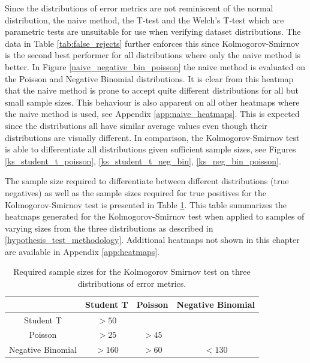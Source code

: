 Since the distributions of error metrics are not reminiscent of the normal distribution, the naive method, the T-test and the Welch's T-test which are parametric tests are unsuitable for use when verifying dataset distributions. The data in Table \ref{tab:false_rejects} further enforces this since Kolmogorov-Smirnov is the second best performer for all distributions where only the naive method is better. In Figure \ref{naive_negative_bin_poisson} the naive method is evaluated on the Poisson and Negative Binomial distributions. It is clear from this heatmap that the naive method is prone to accept quite different distributions for all but small sample sizes. This behaviour is also apparent on all other heatmaps where the naive method is used, see Appendix \ref{app:naive_heatmaps}. This is expected since the distributions all have similar average values even though their distributions are visually different. In comparison, the Kolmogorov-Smirnov test is able to differentiate all distributions given sufficient sample sizes, see Figures \ref{ks_student_t_poisson}, \ref{ks_student_t_neg_bin}, \ref{ks_neg_bin_poisson}.

The sample size required to differentiate between different distributions (true negatives) as well as the sample sizes required for true positives for the Kolmogorov-Smirnov test is presented in Table \ref{tab:required_sample_sizes}. This table summarizes the heatmaps generated for the Kolmogorov-Smirnov test when applied to samples of varying sizes from the three distributions as described in \ref{hypothesis_test_methodology}. Additional heatmaps not shown in this chapter are available in Appendix \ref{app:heatmaps}.


\begin{table}[htp]
    \centering
    \begin{tabular}{cccc}
                          & Student T & Poisson & Negative Binomial \\
        \hline
        Student T         & \(>50\)   &         &                   \\
        \hline
        Poisson           & \(>25\)   & \(>45\) &                   \\
        \hline
        Negative Binomial & \(>160\)  & \(>60\) & \(<130\)          \\
    \end{tabular}
    \caption{Required sample sizes for the Kolmogorov Smirnov test on three distributions of error metrics.}
    \label{tab:required_sample_sizes}
\end{table}

